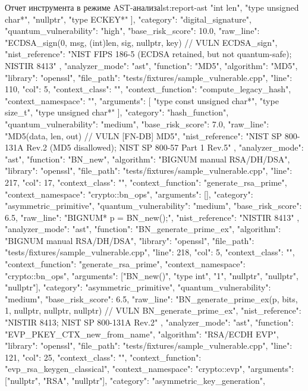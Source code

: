 \documentclass{itmo-vkr}
\begin{document}
\begin{itmolisting}[JSON]{Отчет инструмента в режиме AST-анализа}{lst:report-ast}
{{			"int len",
			"type unsigned char*",
			"nullptr",
			"type ECKEY*"
			],
			"category": "digital_signature",
			"quantum_vulnerability": "high",
			"base_risk_score": 10.0,
			"raw_line": "ECDSA_sign(0, msg, (int)len, sig, nullptr, key) // VULN ECDSA_sign",
			"nist_reference": "NIST FIPS 186-5 (ECDSA retained, but not quantum-safe); NISTIR 8413"
		},
		{
			"analyzer_mode": "ast",
			"function": "MD5",
			"algorithm": "MD5",
			"library": "openssl",
			"file_path": "tests/fixtures/sample_vulnerable.cpp",
			"line": 110,
			"col": 5,
			"context_class": "",
			"context_function": "compute_legacy_hash",
			"context_namespace": "",
			"arguments": [
			"type const unsigned char*",
			"type size_t",
			"type unsigned char*"
			],
			"category": "hash_function",
			"quantum_vulnerability": "medium",
			"base_risk_score": 7.0,
			"raw_line": "MD5(data, len, out) // VULN [FN-DB] MD5",
			"nist_reference": "NIST SP 800-131A Rev.2 (MD5 disallowed); NIST SP 800-57 Part 1 Rev.5"
		},
		{
			"analyzer_mode": "ast",
			"function": "BN_new",
			"algorithm": "BIGNUM manual RSA/DH/DSA",
			"library": "openssl",
			"file_path": "tests/fixtures/sample_vulnerable.cpp",
			"line": 217,
			"col": 17,
			"context_class": "",
			"context_function": "generate_rsa_prime",
			"context_namespace": "crypto::bn_ops",
			"arguments": [],
			"category": "asymmetric_primitive",
			"quantum_vulnerability": "medium",
			"base_risk_score": 6.5,
			"raw_line": "BIGNUM* p = BN_new();",
			"nist_reference": "NISTIR 8413"
		},
		{
			"analyzer_mode": "ast",
			"function": "BN_generate_prime_ex",
			"algorithm": "BIGNUM manual RSA/DH/DSA",
			"library": "openssl",
			"file_path": "tests/fixtures/sample_vulnerable.cpp",
			"line": 218,
			"col": 5,
			"context_class": "",
			"context_function": "generate_rsa_prime",
			"context_namespace": "crypto::bn_ops",
			"arguments": ["BN_new()", "type int", "1", "nullptr", "nullptr", "nullptr"],
			"category": "asymmetric_primitive",
			"quantum_vulnerability": "medium",
			"base_risk_score": 6.5,
			"raw_line": "BN_generate_prime_ex(p, bits, 1, nullptr, nullptr, nullptr) // VULN BN_generate_prime_ex",
			"nist_reference": "NISTIR 8413; NIST SP 800-131A Rev.2"
		},
		{
			"analyzer_mode": "ast",
			"function": "EVP_PKEY_CTX_new_from_name",
			"algorithm": "RSA/ECDH EVP",
			"library": "openssl",
			"file_path": "tests/fixtures/sample_vulnerable.cpp",
			"line": 121,
			"col": 25,
			"context_class": "",
			"context_function": "evp_rsa_keygen_classical",
			"context_namespace": "crypto::evp",
			"arguments": ["nullptr", "RSA", "nullptr"],
			"category": "asymmetric_key_generation",
}}
\end{itmolisting}
\end{document}
